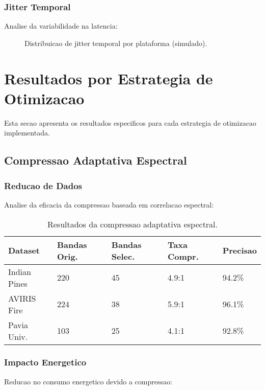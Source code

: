 \subsubsection{Jitter Temporal}
Analise da variabilidade na latencia:

\begin{figure}[!htb]
\centering
\caption[Analise de Jitter]{Distribuicao de jitter temporal por plataforma (simulado).}
\label{fig:jitter_analysis}
\end{figure}

\section{Resultados por Estrategia de Otimizacao}\label{sec:resultados_estrategias}

Esta secao apresenta os resultados especificos para cada estrategia de otimizacao implementada.

\subsection{Compressao Adaptativa Espectral}

\subsubsection{Reducao de Dados}
Analise da eficacia da compressao baseada em correlacao espectral:

\begin{table}[!htp]
\caption[Resultados de Compressao]{Resultados da compressao adaptativa espectral.}
\label{tab:compressao_resultados}
\begin{center}
\begin{tabular}{|p{3cm}|p{2cm}|p{2cm}|p{2cm}|p{2cm}|}
\hline
\textbf{Dataset} & \textbf{Bandas Orig.} & \textbf{Bandas Selec.} & \textbf{Taxa Compr.} & \textbf{Precisao} \\
\hline
Indian Pines & 220 & 45 & 4.9:1 & 94.2\% \\
\hline
AVIRIS Fire & 224 & 38 & 5.9:1 & 96.1\% \\
\hline
Pavia Univ. & 103 & 25 & 4.1:1 & 92.8\% \\
\hline
\end{tabular}
\end{center}
\end{table}

\subsubsection{Impacto Energetico}
Reducao no consumo energetico devido a compressao:

